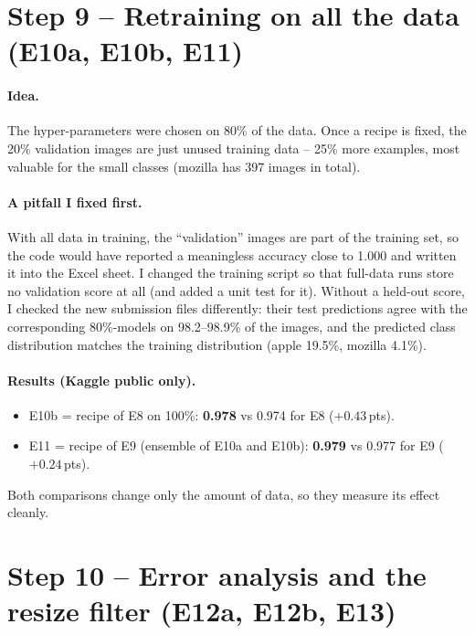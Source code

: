 \documentclass[11pt,a4paper]{article}
\newcommand{\pt}{\,pts}
\begin{document}
\section{Step 9 -- Retraining on all the data (E10a, E10b, E11)}

\paragraph{Idea.} The hyper-parameters were chosen on 80\% of the data. Once a recipe is fixed, the
20\% validation images are just unused training data -- 25\% more examples, most valuable for the small
classes (mozilla has 397 images in total).

\paragraph{A pitfall I fixed first.} With all data in training, the ``validation'' images are part of
the training set, so the code would have reported a meaningless accuracy close to 1.000 and written
it into the Excel sheet. I changed the training script so that full-data runs store no validation
score at all (and added a unit test for it). Without a held-out score, I checked the new submission
files differently: their test predictions agree with the corresponding 80\%-models on 98.2--98.9\% of
the images, and the predicted class distribution matches the training distribution (apple 19.5\%,
mozilla 4.1\%).

\paragraph{Results (Kaggle public only).}
\begin{itemize}[leftmargin=*]
\item E10b = recipe of E8 on 100\%: \textbf{0.978} vs 0.974 for E8 ($+0.43$\pt).
\item E11 = recipe of E9 (ensemble of E10a and E10b): \textbf{0.979} vs 0.977 for E9 ($+0.24$\pt).
\end{itemize}
Both comparisons change only the amount of data, so they measure its effect cleanly.

\section{Step 10 -- Error analysis and the resize filter (E12a, E12b, E13)}
\end{document}

